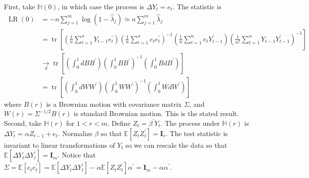 \documentclass[10pt]{article}
\begin{document}
First, take $\mathbb{H}(0)$, in which case the process is $\Delta Y_{t}=e_{t}$. The statistic is
$$
\begin{aligned}
\operatorname{LR}(0) &=-n \sum_{j=1}^{m} \log \left(1-\hat{\lambda}_{j}\right) \simeq n \sum_{j=1}^{m} \widehat{\lambda}_{j} \\
&=\operatorname{tr}\left[\left(\frac{1}{n} \sum_{t=1}^{n} Y_{t-1} e_{t}^{\prime}\right)\left(\frac{1}{n} \sum_{t=1}^{n} e_{t} e_{t}^{\prime}\right)^{-1}\left(\frac{1}{n} \sum_{t=1}^{n} e_{t} Y_{t-1}^{\prime}\right)\left(\frac{1}{n^{2}} \sum_{t=1}^{n} Y_{t-1} Y_{t-1}^{\prime}\right)^{-1}\right] \\
& \underset{d}{\rightarrow} \operatorname{tr}\left[\left(\int_{0}^{1} d B B^{\prime}\right)\left(\int_{0}^{1} B B^{\prime}\right)^{-1}\left(\int_{0}^{1} B d B^{\prime}\right)\right] \\
&=\operatorname{tr}\left[\left(\int_{0}^{1} d W W^{\prime}\right)\left(\int_{0}^{1} W W^{\prime}\right)^{-1}\left(\int_{0}^{1} W d W^{\prime}\right)\right]
\end{aligned}
$$
where $B(r)$ is a Brownian motion with covariance matrix $\Sigma$, and $W(r)=\Sigma^{-1 / 2} B(r)$ is standard Brownian motion. This is the stated result. Second, take $\mathbb{H}(r)$ for $1<r<m$. Define $Z_{t}=\beta^{\prime} Y_{t}$. The process under $\mathbb{H}(r)$ is $\Delta Y_{t}=\alpha Z_{t-1}+e_{t}$. Normalize $\beta$ so that $\mathbb{E}\left[Z_{t} Z_{t}^{\prime}\right]=\boldsymbol{I}_{r}$. The test statistic is invariant to linear transformations of $Y_{t}$ so we can rescale the data so that $\mathbb{E}\left[\Delta Y_{t} \Delta Y_{t}^{\prime}\right]=\boldsymbol{I}_{m}$. Notice that $\Sigma=\mathbb{E}\left[e_{t} e_{t}^{\prime}\right]=\mathbb{E}\left[\Delta Y_{t} \Delta Y_{t}^{\prime}\right]-\alpha \mathbb{E}\left[Z_{t} Z_{t}^{\prime}\right] \alpha^{\prime}=\boldsymbol{I}_{m}-\alpha \alpha^{\prime}$.
\end{document}
